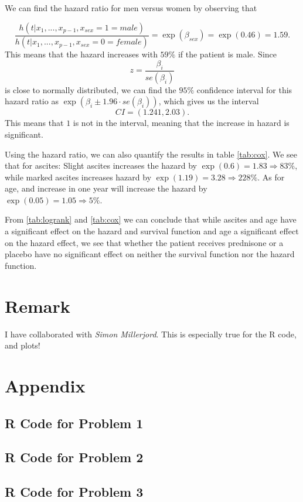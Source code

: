 \documentclass[a4paper,norsk, 10pt]{article}
\begin{document}
We can find the hazard ratio for men versus women by observing that

\begin{equation}
\frac{h(t|x_1,...,x_{p-1},x_{sex} = 1 = male)}{h(t|x_1,...,x_{p-1},x_{sex} = 0 = female)} = \exp(\beta_{sex}) = \exp(0.46) = 1.59.
\end{equation}
This means that the hazard increases with $59\%$ if the patient is male. Since
\begin{equation}
z = \frac{\beta_i}{se(\beta_i)}
\end{equation}
is close to normally distributed, we can find the $95\%$ confidence interval for this hazard ratio as $\exp(\beta_i \pm 1.96\cdot se(\beta_i))$, which gives us the interval
\begin{equation}
CI = (1.241,2.03).
\end{equation}
This means that $1$ is not in the interval, meaning that the increase in hazard is significant.

Using the hazard ratio, we can also quantify the results in table \ref{tab:cox}. We see that for ascites: Slight ascites increases the hazard by $\exp(0.6) = 1.83 \Rightarrow 83 \%$, while marked ascites increases hazard by $\exp(1.19) = 3.28 \Rightarrow 228 \%$. As for age, and increase in one year will increase the hazard by $\exp(0.05) = 1.05 \Rightarrow 5\%$.


From \ref{tab:logrank} and \ref{tab:cox} we can conclude that while ascites and age have a significant effect on the hazard and survival function and age a significant effect on the hazard effect, we see that whether the patient receives prednisone or a placebo have no significant effect on neither the survival function nor the hazard function.


\section*{Remark}
I have collaborated with \textit{Simon Millerjord}. This is especially true for the R code, and plots!


\newpage
\section*{Appendix}
\subsection*{R Code for Problem 1}



\newpage

\subsection*{R Code for Problem 2}



\subsection*{R Code for Problem 3}


\end{document}
